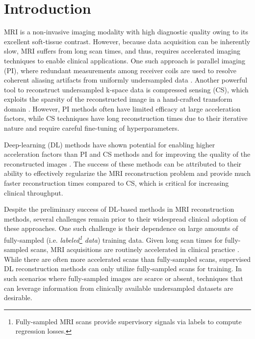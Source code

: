 \documentclass[10pt,twocolumn,letterpaper]{article}
\begin{document}
\section{Introduction}
MRI is a non-invasive imaging modality with high diagnostic quality owing to its excellent soft-tissue contrast. However, because data acquisition can be inherently slow, MRI suffers from long scan times, and thus, requires accelerated imaging techniques to enable clinical applications. One such approach is parallel imaging (PI), where redundant measurements among receiver coils are used to resolve coherent aliasing artifacts from uniformly undersampled data \cite{pruessmann1999sense, griswold2002generalized}. Another powerful tool to reconstruct undersampled k-space data is compressed sensing (CS), which exploits the sparsity of the reconstructed image in a hand-crafted transform domain \cite{cs-mri}. However, PI methods often have limited efficacy at large acceleration factors, while CS techniques have long reconstruction times due to their iterative nature and require careful fine-tuning of hyperparameters.

Deep-learning (DL) methods have shown potential for enabling higher acceleration factors than PI and CS methods and for improving the quality of the reconstructed images \cite{hammernik2018learning,sandino2020compressed,wang2016accelerating}. The success of these methods can be attributed to their ability to effectively regularize the MRI reconstruction problem and provide much faster reconstruction times compared to CS, which is critical for increasing clinical throughput.

Despite the preliminary success of DL-based methods in MRI reconstruction methods, several challenges remain prior to their widespread clinical adoption of these approaches. One such challenge is their dependence on large amounts of fully-sampled (i.e. \textit{labeled\footnote{Fully-sampled MRI scans provide supervisory signals via labels to compute regression losses.} data}) training data. Given long scan times for fully-sampled scans, MRI acquisitions are routinely accelerated in clinical practice \cite{liu2018highly,cheng2016comprehensive,chaudhari2019combined}. While there are often more accelerated scans than fully-sampled scans, supervised DL reconstruction methods can only utilize fully-sampled scans for training. In such scenarios where fully-sampled images are scarce or absent, techniques that can leverage information from clinically available undersampled datasets are desirable.
\end{document}
